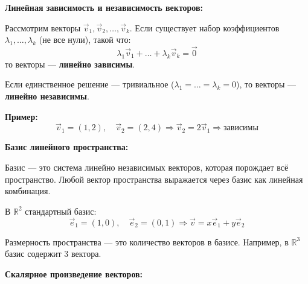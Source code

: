 \vspace{2em}
\textbf{Линейная зависимость и независимость векторов:}

Рассмотрим векторы $\vec{v}_1, \vec{v}_2, \dots, \vec{v}_k$. Если существует набор коэффициентов $\lambda_1, \dots, \lambda_k$ (не все нули), такой что:
\[
\lambda_1 \vec{v}_1 + \dots + \lambda_k \vec{v}_k = \vec{0}
\]
то векторы — \textbf{линейно зависимы}.

Если единственное решение — тривиальное ($\lambda_1 = \dots = \lambda_k = 0$), то векторы — \textbf{линейно независимы}.

\textbf{Пример:}
\[
\vec{v}_1 = (1, 2), \quad \vec{v}_2 = (2, 4) \Rightarrow \vec{v}_2 = 2 \vec{v}_1 \Rightarrow \text{зависимы}
\]

\begin{center}
\end{center}

\vspace{2em}
\textbf{Базис линейного пространства:}

Базис — это система линейно независимых векторов, которая порождает всё пространство.  
Любой вектор пространства выражается через базис как линейная комбинация.

В $\mathbb{R}^2$ стандартный базис:
\[
\vec{e}_1 = (1, 0), \quad \vec{e}_2 = (0, 1)
\Rightarrow \vec{v} = x \vec{e}_1 + y \vec{e}_2
\]

\begin{center}
\end{center}

Размерность пространства — это количество векторов в базисе. Например, в $\mathbb{R}^3$ базис содержит 3 вектора.

\vspace{2em}
\textbf{Скалярное произведение векторов:}

